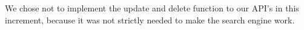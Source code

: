 

We chose not to implement the update and delete function to our API's in this increment, 
because it was not strictly needed to make the search engine work.





    






